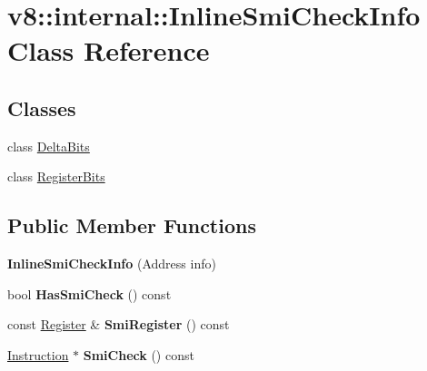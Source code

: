 \hypertarget{classv8_1_1internal_1_1_inline_smi_check_info}{}\section{v8\+:\+:internal\+:\+:Inline\+Smi\+Check\+Info Class Reference}
\label{classv8_1_1internal_1_1_inline_smi_check_info}
\subsection*{Classes}
\begin{DoxyCompactItemize}
\item 
class \hyperlink{classv8_1_1internal_1_1_inline_smi_check_info_1_1_delta_bits}{Delta\+Bits}
\item 
class \hyperlink{classv8_1_1internal_1_1_inline_smi_check_info_1_1_register_bits}{Register\+Bits}
\end{DoxyCompactItemize}
\subsection*{Public Member Functions}
\begin{DoxyCompactItemize}
\item 
{\bfseries Inline\+Smi\+Check\+Info} (Address info)\hypertarget{classv8_1_1internal_1_1_inline_smi_check_info_ab647b236c0ca96e8e48c31309101ffd3}{}\label{classv8_1_1internal_1_1_inline_smi_check_info_ab647b236c0ca96e8e48c31309101ffd3}

\item 
bool {\bfseries Has\+Smi\+Check} () const \hypertarget{classv8_1_1internal_1_1_inline_smi_check_info_a6080eadc09f1afa4a67744db5c06eaed}{}\label{classv8_1_1internal_1_1_inline_smi_check_info_a6080eadc09f1afa4a67744db5c06eaed}

\item 
const \hyperlink{structv8_1_1internal_1_1_register}{Register} \& {\bfseries Smi\+Register} () const \hypertarget{classv8_1_1internal_1_1_inline_smi_check_info_aceaf52a7b47e74761d420cf5537bf2ea}{}\label{classv8_1_1internal_1_1_inline_smi_check_info_aceaf52a7b47e74761d420cf5537bf2ea}

\item 
\hyperlink{classv8_1_1internal_1_1_instruction}{Instruction} $\ast$ {\bfseries Smi\+Check} () const \hypertarget{classv8_1_1internal_1_1_inline_smi_check_info_a731fd969bfcfa0dd8174eae800534019}{}\label{classv8_1_1internal_1_1_inline_smi_check_info_a731fd969bfcfa0dd8174eae800534019}

\end{DoxyCompactItemize}
